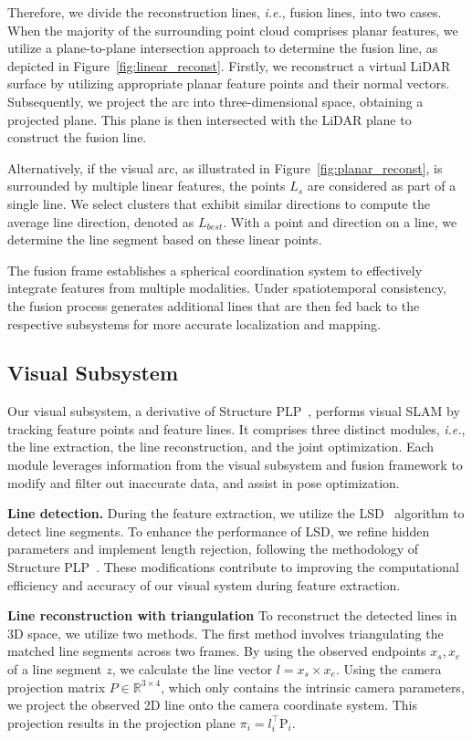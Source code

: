 Therefore, we divide the reconstruction lines, \textit{i.e.}, fusion lines, into two cases. When the majority of the surrounding point cloud comprises planar features, we utilize a plane-to-plane intersection approach to determine the fusion line, as depicted in Figure~\ref{fig:linear_reconst}. Firstly, we reconstruct a virtual LiDAR surface by utilizing appropriate planar feature points and their normal vectors. Subsequently, we project the arc into three-dimensional space, obtaining a projected plane. This plane is then intersected with the LiDAR plane to construct the fusion line.

Alternatively, if the visual arc, as illustrated in Figure~\ref{fig:planar_reconst}, is surrounded by multiple linear features, the points $L_s$ are considered as part of a single line. We select clusters that exhibit similar directions to compute the average line direction, denoted as $L_{best}$. With a point and direction on a line, we determine the line segment based on these linear points.

The fusion frame establishes a spherical coordination system to effectively integrate features from multiple modalities. Under spatiotemporal consistency, the fusion process generates additional lines that are then fed back to the respective subsystems for more accurate localization and mapping.

\subsection{Visual Subsystem}
Our visual subsystem, a derivative of Structure PLP~\cite{shu2022structure}, performs visual SLAM by tracking feature points and feature lines. It comprises three distinct modules, \textit{i.e.}, the line extraction, the line reconstruction, and the joint optimization. Each module leverages information from the visual subsystem and fusion framework to modify and filter out inaccurate data, and assist in pose optimization. 
%

\noindent\textbf{Line detection.} During the feature extraction, we utilize the LSD~\cite{engel2014lsd} algorithm to detect line segments. To enhance the performance of LSD, we refine hidden parameters and implement length rejection, following the methodology of Structure PLP~\cite{shu2022structure}. These modifications contribute to improving the computational efficiency and accuracy of our visual system during feature extraction.

\noindent\textbf{Line reconstruction with triangulation} To reconstruct the detected lines in 3D space, we utilize two methods. The first method involves triangulating the matched line segments across two frames. By using the observed endpoints ${x_s, x_e}$ of a line segment $z$, we calculate the line vector ${l} = {x}_s \times {x}_e$. Using the camera projection matrix $P\in \mathbb{R}^{3 \times 4}$, which only contains the intrinsic camera parameters, we project the observed 2D line onto the camera coordinate system. This projection results in the projection plane $\pi_i = {l}_i^{\top} \mathrm{P}_i$.


